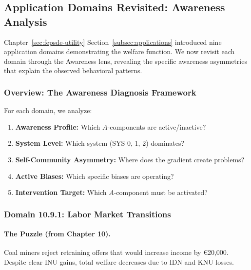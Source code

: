 \subsection{Application Domains Revisited: Awareness Analysis}
\label{subsec:awareness-applications-revisited}

Chapter~\ref{sec:fepsde-utility} Section~\ref{subsec:applications} introduced
nine application domains demonstrating the welfare function. We now revisit
each domain through the Awareness lens, revealing the specific awareness
asymmetries that explain the observed behavioral patterns.

\subsubsection{Overview: The Awareness Diagnosis Framework}

For each domain, we analyze:
\begin{enumerate}
\item \textbf{Awareness Profile:} Which $A$-components are active/inactive?
\item \textbf{System Level:} Which system (SYS 0, 1, 2) dominates?
\item \textbf{Self-Community Asymmetry:} Where does the gradient create problems?
\item \textbf{Active Biases:} Which specific biases are operating?
\item \textbf{Intervention Target:} Which $A$-component must be activated?
\end{enumerate}

\subsubsection{Domain 10.9.1: Labor Market Transitions}
\label{subsubsec:awareness-labor}

\paragraph{The Puzzle (from Chapter 10).}
Coal miners reject retraining offers that would increase income by \euro{20,000}.
Despite clear INU gains, total welfare decreases due to IDN and KNU losses.

